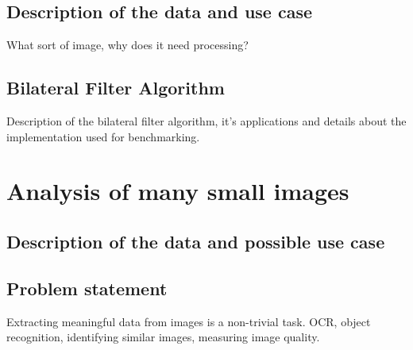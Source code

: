 \documentclass [12pt,a4paper]{report}
\begin{document}
\subsection{Description of the data and use case}
What sort of image, why does it need processing?

\subsection{Bilateral Filter Algorithm}
Description of the bilateral filter algorithm, it's applications and details about the implementation used for benchmarking.

\section{Analysis of many small images}

\subsection{Description of the data and possible use case}

\subsection{Problem statement}

Extracting meaningful data from images is a non-trivial task. OCR, object recognition, identifying similar images, measuring image quality.


\clearpage
{}


\end{document}
